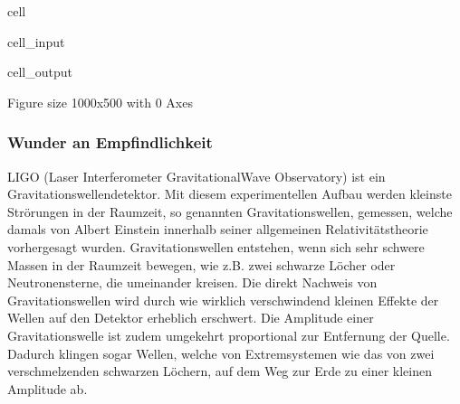 \documentclass[letterpaper,10pt,english]{jupyterBook}
\begin{document}
\begin{sphinxuseclass}{cell}
\begin{sphinxVerbatimInput}
\begin{sphinxuseclass}{cell_input}
\begin{sphinxVerbatim}[commandchars=\\\{\}]
\PYG{p}{[}\PYG{p}{]}
\PYG{p}{[}\PYG{p}{]}
\PYG{p}{[}\PYG{p}{]}
\PYG{p}{[}\PYG{p}{]}

\end{sphinxVerbatim}

\end{sphinxuseclass}\end{sphinxVerbatimInput}
\begin{sphinxVerbatimOutput}

\begin{sphinxuseclass}{cell_output}
\begin{sphinxVerbatim}[commandchars=\\\{\}]
\PYGZlt{}Figure size 1000x500 with 0 Axes\PYGZgt{}
\end{sphinxVerbatim}

\noindent{}

\end{sphinxuseclass}\end{sphinxVerbatimOutput}

\end{sphinxuseclass}

\subsubsection{Wunder an Empfindlichkeit}
\label{\detokenize{content/2_idealeKennlinie:wunder-an-empfindlichkeit}}
\sphinxAtStartPar
LIGO (Laser Interferometer Gravitational\sphinxhyphen{}Wave Observatory) ist ein Gravitationswellendetektor. Mit diesem experimentellen Aufbau werden kleinste Strörungen in der Raumzeit, so genannten Gravitationswellen, gemessen, welche damals von Albert Einstein innerhalb seiner allgemeinen Relativitätstheorie vorhergesagt wurden. Gravitationswellen entstehen, wenn sich sehr schwere Massen in der Raumzeit bewegen, wie z.B. zwei schwarze Löcher oder Neutronensterne, die umeinander kreisen. Die direkt Nachweis von Gravitationswellen wird durch wie wirklich verschwindend kleinen Effekte der Wellen auf den Detektor erheblich erschwert. Die Amplitude einer Gravitationswelle ist zudem umgekehrt proportional zur Entfernung der Quelle. Dadurch klingen sogar Wellen, welche von Extremsystemen wie das von zwei verschmelzenden schwarzen Löchern, auf dem Weg zur Erde zu einer kleinen Amplitude ab.
\end{document}
